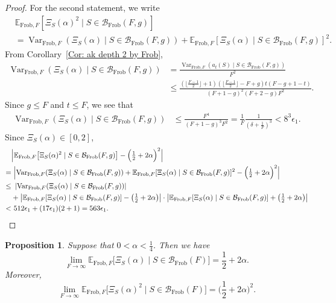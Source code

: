 \documentclass[12pt]{amsart}
\def\B{{\mathcal B}}
\def\E{{\mathbb E}}
\def\Var{{\operatorname{Var}}}
\newcommand{\Frob}{\text{Frob}}
\newtheorem{proposition}[theorem]{Proposition}
\begin{document}
\begin{proof}
For the second statement, we write
\begin{align*}
&\E_{\Frob,F}[\Xi_S(\alpha)^2\mid S\in \B_{\Frob}(F,g)]\\
&=\Var_{\Frob,F}(\Xi_S(\alpha)\mid S\in \B_{\Frob}(F,g))+\E_{\Frob,F}[\Xi_S(\alpha)\mid S\in \B_{\Frob}(F,g)]^2.
\end{align*}
From Corollary~\ref{Cor: ak depth 2 by Frob},
\begin{align*}
\Var_{\Frob,F}(\Xi_S(\alpha)\mid S\in \B_{\Frob}(F,g))
&=\frac{\Var_{\Frob,F}(a_t(S)\mid S\in \B_{\Frob}(F,g))}{F^2}\\
&\le \frac{(\lfloor\frac{F-1}{2}\rfloor+1)(\lfloor\frac{F-1}{2}\rfloor-F+g) t (F-g+1-t)}{(F+1-g)^2 (F+2-g) F^2}.
\end{align*}
Since $g\leq F$ and $t\leq F$, we see that
\begin{align*}
\Var_{\Frob,F}(\Xi_S(\alpha)\mid S\in \B_{\Frob}(F,g))
&\leq \frac{F^4}{(F+1-g)^3 F^2} =\frac{1}{F} \frac{1}{(\delta+\frac{1}{F})^3} <8^3 \epsilon_1.
\end{align*}
Since $\Xi_S(\alpha)\in[0,2]$,
\begin{align*}
& \Bigl| \E_{\Frob,F}\big[\Xi_S(\alpha)^2 \mid S\in\mathcal B_{\Frob}(F,g)\big]
-\Big(\tfrac{1}{2}+2\alpha\Big)^2\Bigr|\\
= &\ \Bigl| \Var_{\Frob,F}(\Xi_S(\alpha)\mid S\in \B_{\Frob}(F,g))
+\E_{\Frob,F}[\Xi_S(\alpha)\mid S\in \B_{\Frob}(F,g)]^2
-\Big(\tfrac{1}{2}+2\alpha\Big)^2\Bigr|\\
\leq &\ \left| \Var_{\Frob,F}(\Xi_S(\alpha)\mid S\in \B_{\Frob}(F,g)) \right| \\
& +\bigl| \E_{\Frob,F}[\Xi_S(\alpha)\mid S\in \B_{\Frob}(F,g)]
-\big(\tfrac{1}{2}+2\alpha\big) \bigr| 
\cdot \bigl| \E_{\Frob,F}[\Xi_S(\alpha)\mid S\in \B_{\Frob}(F,g)]
+\big(\tfrac{1}{2}+2\alpha\big)\bigr|\\
< &\  512 \epsilon_1 + (17\epsilon_1) (2+1) =563\epsilon_1. \qedhere 
\end{align*}
\end{proof}

\begin{proposition}\label{Prop: small alpha depth 2 by frob}
Suppose that $0<\alpha<\frac{1}{4}$.
Then we have
\[
\lim_{F\to\infty} \E_{\Frob,F} \big[\Xi_S(\alpha)\mid S\in\mathcal B_{\Frob}(F)\big] = \frac{1}{2}+2\alpha. 
\]
Moreover,
\[\lim_{F\to\infty} \E_{\Frob,F} \big[\Xi_S(\alpha)^2 \mid S\in\mathcal B_{\Frob}(F)\big] = \Big(\frac{1}{2}+2\alpha\Big)^2. \]
\end{proposition}
\end{document}
